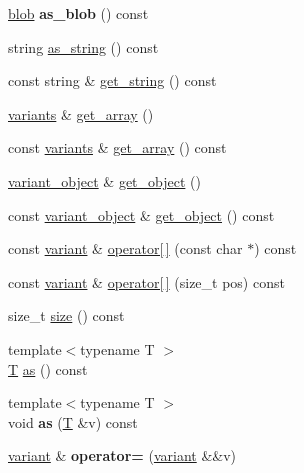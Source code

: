\begin{DoxyCompactItemize}
\mbox{\hyperlink{structfc_1_1blob}{blob}} {\bfseries as\+\_\+blob} () const
\item 
string \mbox{\hyperlink{classfc_1_1variant_acbd70a93184e4277631f2a261acb707c}{as\+\_\+string}} () const
\item 
const string \& \mbox{\hyperlink{classfc_1_1variant_a2ca9f4d2feb8c9743da4128b18bfa886}{get\+\_\+string}} () const
\item 
\mbox{\hyperlink{classstd_1_1vector}{variants}} \& \mbox{\hyperlink{classfc_1_1variant_aea83c87e4e1b1e185f57717b4bd683a5}{get\+\_\+array}} ()
\item 
const \mbox{\hyperlink{classstd_1_1vector}{variants}} \& \mbox{\hyperlink{classfc_1_1variant_a5cb44834253397df276f5107cf9211b6}{get\+\_\+array}} () const
\item 
\mbox{\hyperlink{classfc_1_1variant__object}{variant\+\_\+object}} \& \mbox{\hyperlink{classfc_1_1variant_a17a7054a10963360c6a14d60f6e30128}{get\+\_\+object}} ()
\item 
const \mbox{\hyperlink{classfc_1_1variant__object}{variant\+\_\+object}} \& \mbox{\hyperlink{classfc_1_1variant_a3efce335057e900b569af78acb1cad6c}{get\+\_\+object}} () const
\item 
const \mbox{\hyperlink{classfc_1_1variant}{variant}} \& \mbox{\hyperlink{classfc_1_1variant_afc8519b6b2c1c192506a10289196cbf5}{operator\mbox{[}$\,$\mbox{]}}} (const char $\ast$) const
\item 
const \mbox{\hyperlink{classfc_1_1variant}{variant}} \& \mbox{\hyperlink{classfc_1_1variant_af88be0a0533f9d58f36d88339d42f9fd}{operator\mbox{[}$\,$\mbox{]}}} (size\+\_\+t pos) const
\item 
size\+\_\+t \mbox{\hyperlink{classfc_1_1variant_a67f6416c5dd1b9c53b4b20b73f9cd117}{size}} () const
\item 
{\footnotesize template$<$typename T $>$ }\\\mbox{\hyperlink{struct_t}{T}} \mbox{\hyperlink{classfc_1_1variant_a82edd1f33199355d3a1f19bbb92909cc}{as}} () const
\item 
\mbox{\label{classfc_1_1variant_a38d824a91168bea0aed58a29d782d4cd}} 
{\footnotesize template$<$typename T $>$ }\\void {\bfseries as} (\mbox{\hyperlink{struct_t}{T}} \&v) const
\item 
\mbox{\label{classfc_1_1variant_a0dca5e5489ee3baac5bdab51417d9e02}} 
\mbox{\hyperlink{classfc_1_1variant}{variant}} \& {\bfseries operator=} (\mbox{\hyperlink{classfc_1_1variant}{variant}} \&\&v)

\end{DoxyCompactItemize}
